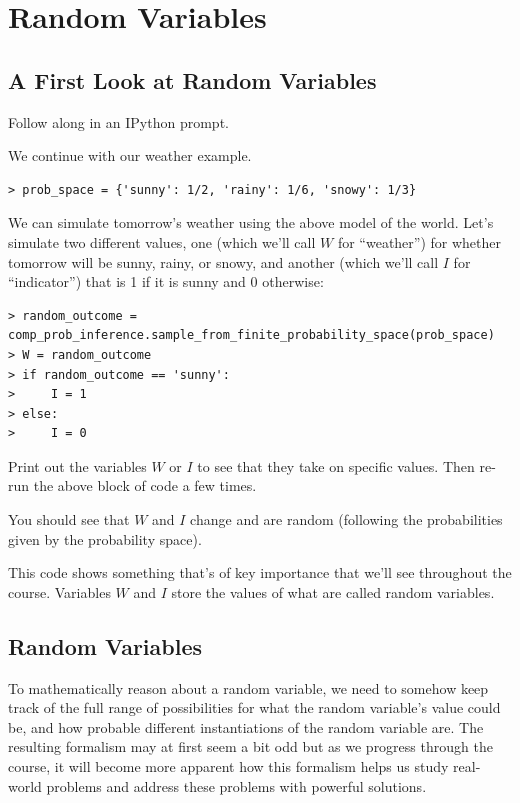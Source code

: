 \documentclass[6008notes.tex]{subfiles}
\begin{document}
\graphicspath{ {images/randvar/} }

\section{Random Variables}

\subsection{A First Look at Random Variables}
Follow along in an IPython prompt.

We continue with our weather example.

\begin{lstlisting}
> prob_space = {'sunny': 1/2, 'rainy': 1/6, 'snowy': 1/3}
\end{lstlisting}

We can simulate tomorrow's weather using the above model of the world. Let's simulate two different values, one (which we'll call $W$ for ``weather'') for whether tomorrow will be sunny, rainy, or snowy, and another (which we'll call $I$ for ``indicator'') that is 1 if it is sunny and 0 otherwise:

\begin{lstlisting}
> random_outcome = comp_prob_inference.sample_from_finite_probability_space(prob_space)
> W = random_outcome
> if random_outcome == 'sunny':
>     I = 1
> else:
>     I = 0
\end{lstlisting}

Print out the variables $W$ or $I$ to see that they take on specific values. Then re-run the above block of code a few times.

You should see that $W$ and $I$ change and are random (following the probabilities given by the probability space).

This code shows something that's of key importance that we'll see throughout the course. Variables $W$ and $I$ store the values of what are called random variables.

\subsection{Random Variables}

To mathematically reason about a random variable, we need to somehow keep track of the full range of possibilities for what the random variable's value could be, and how probable different instantiations of the random variable are. The resulting formalism may at first seem a bit odd but as we progress through the course, it will become more apparent how this formalism helps us study real-world problems and address these problems with powerful solutions.
\end{document}
